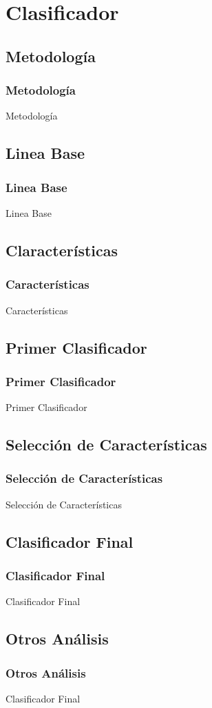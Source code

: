 \section{Clasificador}

\subsection{Metodología}
\begin{frame}
    \frametitle{Metodología}
    Metodología
\end{frame}

\subsection{Linea Base}
\begin{frame}
    \frametitle{Linea Base}
    Linea Base
\end{frame}

\subsection{Claracterísticas}
\begin{frame}
    \frametitle{Características}
    Características
\end{frame}

\subsection{Primer Clasificador}
\begin{frame}
    \frametitle{Primer Clasificador}
    Primer Clasificador
\end{frame}

\subsection{Selección de Características}
\begin{frame}
    \frametitle{Selección de Características}
    Selección de Características
\end{frame}

\subsection{Clasificador Final}
\begin{frame}
    \frametitle{Clasificador Final}
    Clasificador Final
\end{frame}

\subsection{Otros Análisis}
\begin{frame}
    \frametitle{Otros Análisis}
    Clasificador Final
\end{frame}
